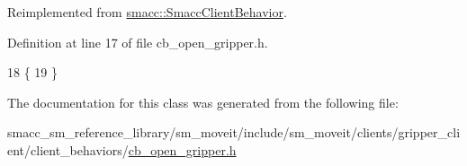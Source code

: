Reimplemented from \hyperlink{classsmacc_1_1SmaccClientBehavior_ac0cd72d42bd00425362a97c9803ecce5}{smacc\+::\+Smacc\+Client\+Behavior}.



Definition at line 17 of file cb\+\_\+open\+\_\+gripper.\+h.


\begin{DoxyCode}
18     \{
19     \}
\end{DoxyCode}


The documentation for this class was generated from the following file\+:\begin{DoxyCompactItemize}
\item 
smacc\+\_\+sm\+\_\+reference\+\_\+library/sm\+\_\+moveit/include/sm\+\_\+moveit/clients/gripper\+\_\+client/client\+\_\+behaviors/\hyperlink{cb__open__gripper_8h}{cb\+\_\+open\+\_\+gripper.\+h}\end{DoxyCompactItemize}
